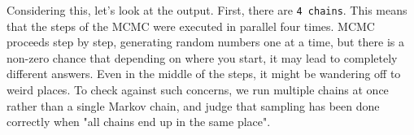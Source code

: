 \documentclass{ltjbook}
\begin{document}



Considering this, let's look at the output. First, there are \texttt{4 chains}. This means that the steps of the MCMC were executed in parallel four times. MCMC proceeds step by step, generating random numbers one at a time, but there is a non-zero chance that depending on where you start, it may lead to completely different answers. Even in the middle of the steps, it might be wandering off to weird places. To check against such concerns, we run multiple chains at once rather than a single Markov chain, and judge that sampling has been done correctly when "all chains end up in the same place".
\end{document}
